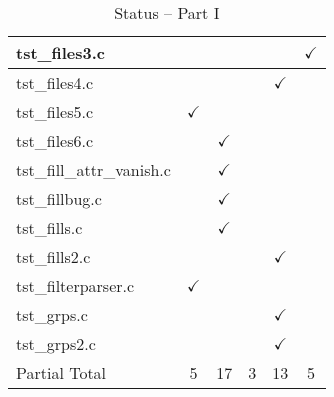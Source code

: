 \begin{table}[H]
\begin{tabular}{|l|c|c|c|c|c|}
tst\_files3.c           &               &               &               &               & $\checkmark$  \\ \hline
tst\_files4.c           &               &               &               & $\checkmark$  &               \\ \hline
tst\_files5.c           & $\checkmark$  &               &               &               &               \\ \hline
tst\_files6.c           &               & $\checkmark$  &               &               &               \\ \hline
tst\_fill\_attr\_vanish.c   &           & $\checkmark$  &               &               &               \\ \hline
tst\_fillbug.c          &               & $\checkmark$  &               &               &               \\ \hline
tst\_fills.c            &               & $\checkmark$  &               &               &               \\ \hline
tst\_fills2.c           &               &               &               & $\checkmark$  &               \\ \hline
tst\_filterparser.c     & $\checkmark$  &               &               &               &               \\ \hline
tst\_grps.c             &               &               &               & $\checkmark$  &               \\ \hline
tst\_grps2.c            &               &               &               & $\checkmark$  &               \\ \hline
Partial Total           &     5         &       17      &       3       &       13      &       5       \\ \hline
\hline
\end{tabular}
\caption{\label{tab:nc_test4_status_1} Status -- Part I}
\end{table}

\clearpage

